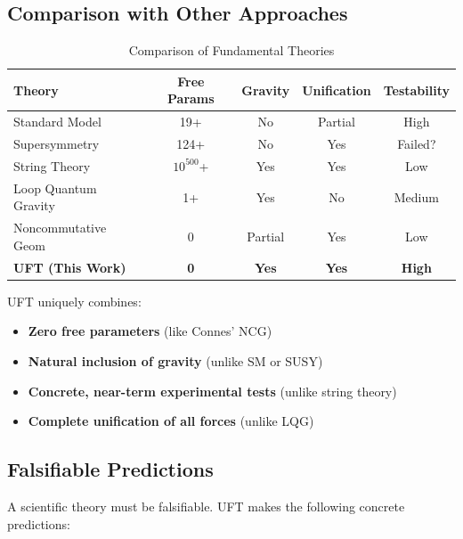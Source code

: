 \subsection{Comparison with Other Approaches}

\begin{table}[htbp]
\centering
\caption{Comparison of Fundamental Theories}
\begin{tabular}{@{}lcccc@{}}
\toprule
\textbf{Theory} & \textbf{Free Params} & \textbf{Gravity} & \textbf{Unification} & \textbf{Testability} \\
\midrule
Standard Model & 19+ & No & Partial & High \\
Supersymmetry & 124+ & No & Yes & Failed? \\
String Theory & $10^{500}$+ & Yes & Yes & Low \\
Loop Quantum Gravity & 1+ & Yes & No & Medium \\
Noncommutative Geom & 0 & Partial & Yes & Low \\
\textbf{UFT (This Work)} & \textbf{0} & \textbf{Yes} & \textbf{Yes} & \textbf{High} \\
\bottomrule
\end{tabular}
\end{table}

UFT uniquely combines:
\begin{itemize}
    \item \textbf{Zero free parameters} (like Connes' NCG)
    \item \textbf{Natural inclusion of gravity} (unlike SM or SUSY)
    \item \textbf{Concrete, near-term experimental tests} (unlike string theory)
    \item \textbf{Complete unification of all forces} (unlike LQG)
\end{itemize}

\subsection{Falsifiable Predictions}

A scientific theory must be falsifiable. UFT makes the following concrete predictions:


